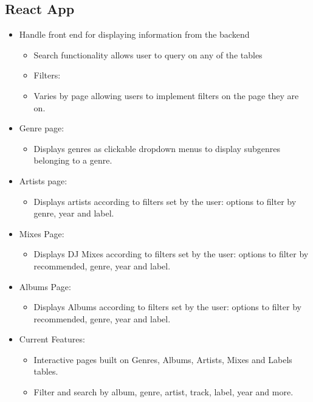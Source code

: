 \documentclass{article}
\begin{document}
    \subsection{React App} 
    \begin{itemize}
        \item Handle front end for displaying information from the backend
        \begin{itemize}
            \item Search functionality allows user to query on any of the tables
            \item Filters:
            \item Varies by page allowing users to implement filters on the page they are on.
        \end{itemize}
        \item Genre page:
        \begin{itemize}
            \item Displays genres as clickable dropdown menus to display subgenres belonging to a genre.
        \end{itemize}
        \item Artists page:
        \begin{itemize}
            \item Displays artists according to filters set by the user: options to filter by genre, year and label.
        \end{itemize}
        \item Mixes Page:
        \begin{itemize}
            \item Displays DJ Mixes according to filters set by the user: options to filter by recommended, genre, year and label.
        \end{itemize}
        \item Albums Page:
        \begin{itemize}
            \item Displays Albums according to filters set by the user: options to filter by recommended, genre, year and label.
        \end{itemize}
        \item Current Features:
        \begin{itemize}
            \item Interactive pages built on Genres, Albums, Artists, Mixes and Labels tables.
            \item Filter and search by album, genre, artist, track, label, year and more.

\end{itemize}
\end{itemize}
\end{document}
